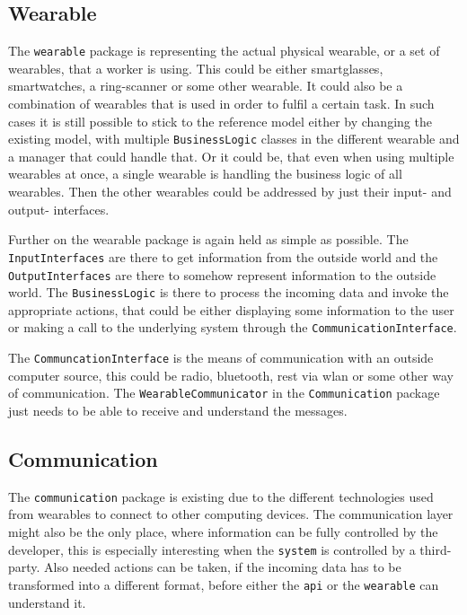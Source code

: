 \subsection{Wearable}
The \texttt{\gls{wearable}} package is representing the actual physical wearable, or a set of wearables, that a worker is using. This could be either \gls{smartglasses}, \gls{smartwatch}es, a ring-scanner or some other \gls{wearable}. It could also be a combination of wearables that is used in order to fulfil a certain task. In such cases it is still possible to stick to the \gls{reference model} either by changing the existing model, with multiple \texttt{BusinessLogic} classes in the different wearable and a manager that could handle that. Or it could be, that even when using multiple wearables at once, a single wearable is handling the business logic of all wearables. Then the other wearables could be addressed by just their input- and output- interfaces.

Further on the wearable package is again held as simple as possible. The \texttt{InputInterfaces} are there to get information from the outside world and the \texttt{OutputInterfaces} are there to somehow represent information to the outside world. The \texttt{BusinessLogic} is there to process the incoming data and invoke the appropriate actions, that could be either displaying some information to the user or making a call to the underlying system through the \texttt{CommunicationInterface}.

The \texttt{CommuncationInterface} is the means of communication with an outside computer source, this could be radio, bluetooth, \gls{rest} via \gls{wlan} or some other way of communication. The \texttt{WearableCommunicator} in the \texttt{Communication} package just needs to be able to receive and understand the messages.
\subsection{Communication}\label{subsec:communication}
The \texttt{communication} package is existing due to the different technologies used from \gls{wearable}s to connect to other computing devices. The communication layer might also be the only place, where information can be fully controlled by the developer, this is especially interesting when the \texttt{system} is controlled by a third-party. Also needed actions can be taken, if the incoming data has to be transformed into a different format, before either the \texttt{\gls{api}} or the \texttt{wearable} can understand it. 

